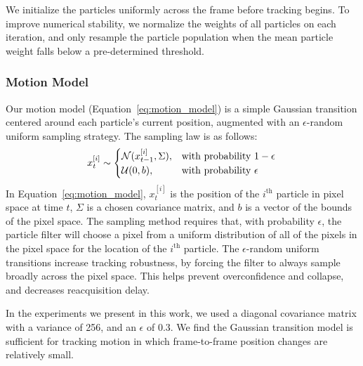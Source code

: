 \documentclass{aamas2013}
\begin{document}
We initialize the particles 
uniformly across the frame before tracking begins. To improve numerical 
stability, we normalize the weights of all particles on each iteration, and 
only resample the particle population when the mean particle weight falls 
below a pre-determined threshold. 
\subsubsection{Motion Model}
Our motion model (Equation~\ref{eq:motion_model}) is a simple Gaussian transition 
centered around each particle's current position, augmented with an 
$\epsilon$-random uniform sampling strategy. The sampling law is as follows:\begin{equation}
\label{eq:motion_model}
x^{[i]}_t \sim \begin{cases}
\mathcal{N}(x^{[i]}_{t-1}, \Sigma), &\text{with probability } 1-\epsilon \\
\mathcal{U}(0,b),& \text{with probability } \epsilon \\
\end{cases}\\
\end{equation}
In Equation~\ref{eq:motion_model}, $x^{[i]}_t$ is the position of the $i^\text{th}$ 
particle in pixel space at time $t$, $\Sigma$ is a chosen covariance matrix, and $b$ 
is a vector of the bounds of the pixel space. The sampling method requires that, with 
probability $\epsilon$, the particle filter will choose a pixel from a uniform 
distribution of all of the pixels in the pixel space for the location of the $i^\text{th}$ 
particle. The $\epsilon$-random uniform transitions increase tracking robustness, by 
forcing the filter to always sample broadly across the pixel space. This helps prevent 
overconfidence and collapse, and decreases reacquisition delay. 

In the experiments we present in this work, we used a diagonal covariance matrix 
with a variance of 256, and an $\epsilon$ of 0.3. We find the Gaussian 
transition model is sufficient for tracking motion in which frame-to-frame 
position changes are relatively small.

\end{document}
